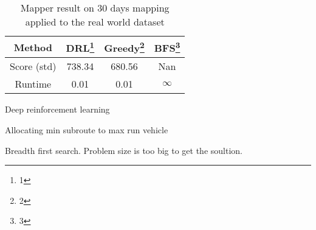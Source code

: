 \documentclass{standalone}
\begin{document}
\begin{table}
    \begin{threeparttable}
        \caption{Mapper result on 30 days mapping applied to the real world dataset}
        \centering
        \begin{tabular}{cccc}                
            \hline\toprule
            Method      & DRL\footnote{1} & Greedy\footnote{2} & BFS\footnote{3} \\ \midrule
            
            Score (std) & 738.34  & 680.56  & Nan \\
            Runtime     & 0.01  & 0.01  & $\infty$ \\
            \bottomrule\hline
            
        \end{tabular}
        
        \begin{tablenotes}
            \item[1] Deep reinforcement learning \\
            \item[2] Allocating min subroute to max run vehicle \\
            \item[3] Breadth first search. Problem size is too big to get the soultion. \\
        \end{tablenotes}
            
    \end{threeparttable}
    \end{table}
    \label{tab: Mapper result}
\end{document}
